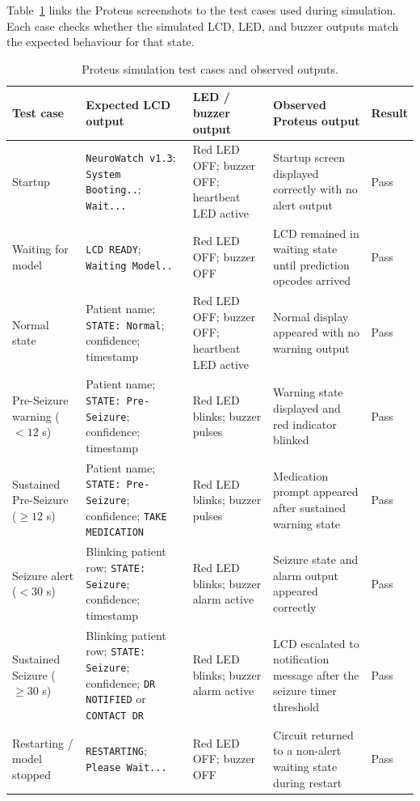 \documentclass[12pt, a4paper]{report}
\begin{document}
Table~\ref{tab:proteus_test_cases} links the Proteus screenshots to the
test cases used during simulation. Each case checks whether the simulated
LCD, LED, and buzzer outputs match the expected behaviour for that state.

\begin{table}[!htbp]
  \centering
  \caption{Proteus simulation test cases and observed outputs.}
  \label{tab:proteus_test_cases}
  \tiny
  \setlength{\tabcolsep}{3pt}
  \renewcommand{\arraystretch}{1.05}
  \begin{tabularx}{\textwidth}{>{\raggedright\arraybackslash}p{2.25cm}
                              >{\raggedright\arraybackslash}p{3.0cm}
                              >{\raggedright\arraybackslash}p{2.8cm}
                              >{\raggedright\arraybackslash}X
                              >{\centering\arraybackslash}p{0.9cm}}
    \toprule
    \textbf{Test case} & \textbf{Expected LCD output} & \textbf{LED / buzzer output} &
    \textbf{Observed Proteus output} & \textbf{Result} \\
    \midrule
    Startup &
    \texttt{NeuroWatch v1.3}; \texttt{System Booting..}; \texttt{Wait...} &
    Red LED OFF; buzzer OFF; heartbeat LED active &
    Startup screen displayed correctly with no alert output &
    Pass \\
    Waiting for model &
    \texttt{LCD READY}; \texttt{Waiting Model..} &
    Red LED OFF; buzzer OFF &
    LCD remained in waiting state until prediction opcodes arrived &
    Pass \\
    Normal state &
    Patient name; \texttt{STATE: Normal}; confidence; timestamp &
    Red LED OFF; buzzer OFF; heartbeat LED active &
    Normal display appeared with no warning output &
    Pass \\
    Pre-Seizure warning ($<12$ s) &
    Patient name; \texttt{STATE: Pre-Seizure}; confidence; timestamp &
    Red LED blinks; buzzer pulses &
    Warning state displayed and red indicator blinked &
    Pass \\
    Sustained Pre-Seizure ($\geq12$ s) &
    Patient name; \texttt{STATE: Pre-Seizure}; confidence; \texttt{TAKE MEDICATION} &
    Red LED blinks; buzzer pulses &
    Medication prompt appeared after sustained warning state &
    Pass \\
    Seizure alert ($<30$ s) &
    Blinking patient row; \texttt{STATE: Seizure}; confidence; timestamp &
    Red LED blinks; buzzer alarm active &
    Seizure state and alarm output appeared correctly &
    Pass \\
    Sustained Seizure ($\geq30$ s) &
    Blinking patient row; \texttt{STATE: Seizure}; confidence;
    \texttt{DR NOTIFIED} or \texttt{CONTACT DR} &
    Red LED blinks; buzzer alarm active &
    LCD escalated to notification message after the seizure timer threshold &
    Pass \\
    Restarting / model stopped &
    \texttt{RESTARTING}; \texttt{Please Wait...} &
    Red LED OFF; buzzer OFF &
    Circuit returned to a non-alert waiting state during restart &
    Pass \\
    \bottomrule
  \end{tabularx}
\end{table}
\end{document}
